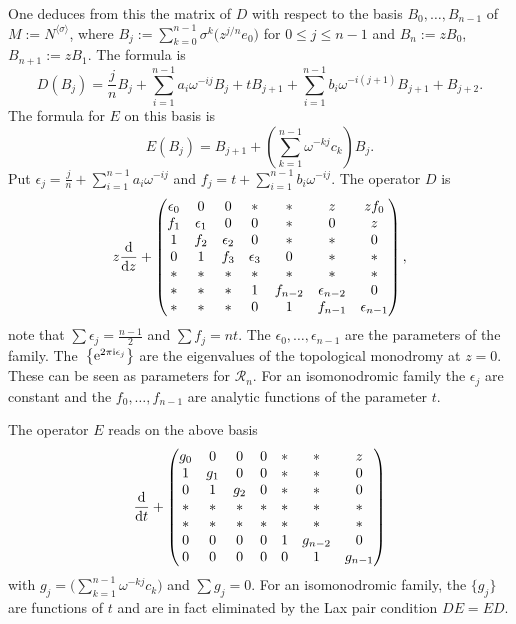 \documentclass[pdftex]{sigma}
\numberwithin{equation}{section}
\begin{document}
 One deduces from this the matrix of $D$ with respect to the basis $B_0,\dots ,B_{n-1}$ of $M:=N^{\langle\sigma\rangle}$,
 where $B_j:=\sum_{k=0}^{n-1} \sigma^k\bigl(z^{j/n}e_0\bigr)$ for $0\leq j\leq n-1$ and $B_n:=zB_0$, $
 B_{n+1}:=zB_1$. The formula is
 \[D(B_j)=\frac{j}{n}B_j+\sum _{i=1}^{n-1}a_i\omega^{-ij}B_j+tB_{j+1}+\sum_{i=1}^{n-1}b_i\omega^{-i(j+1)}B_{j+1}+B_{j+2}.\]
 The formula for $E$ on this basis is
 \[
 E(B_j)= B_{j+1}+\left(\sum _{k=1}^{n-1}\omega^{-kj}c_k\right)B_j.
 \]
 Put $\epsilon_j=\frac{j}{n}+\sum _{i=1}^{n-1}a_i\omega^{-ij}$ and $f_j=t+\sum_{i=1}^{n-1} b_i\omega^{-ij}$. The operator $D$ is
\[
 z\frac{{\rm d}}{{\rm d}z} + \left(\begin{matrix}
 \epsilon_0 &0 &0 &* &* &z & zf_0\\
 f_1 & \epsilon_1& 0 &0 &* & 0 & z \\
 1 & f_2 & \epsilon_2 & 0 & * & * & 0 \\
 0 & 1 & f_3 &\epsilon_3 & 0 & * & * \\
 * & * & * & * & * & * & * \\
 * & * & * & 1 & f_{n-2} &\epsilon_{n-2} & 0 \\
 * & * & * & 0 & 1 & f_{n-1} & \epsilon_{n-1}
 \end{matrix}\right),
 \]
 note that $\sum \epsilon _j=\frac{n-1}{2}$ and $\sum f_j=nt$.
The $\epsilon_0,\dots ,\epsilon_{n-1}$ are the parameters of the family.
 The~$\bigl\{{\rm e}^{2\pi {\rm i} \epsilon_j}\bigr\}$ are the eigenvalues of the topological monodromy at $z=0$. These can be seen as parameters for $\mathcal{R}_n$. For an isomonodromic family the $\epsilon_j$ are constant and the
$f_0,\dots ,f_{n-1}$ are analytic functions of the parameter $t$.

 The operator $E$ reads on the above basis
\[\frac{{\rm d}}{{\rm d}t}+ \left(\begin{matrix}
 g_0 &0 &0 &0 &* &* & z\\
 1 & g_1& 0 &0 &* & * & 0 \\
 0 & 1 & g_2 & 0 & * & * & 0 \\
 * & * & * & * & * & * & * \\
 * & * & * & * &* & * & * \\
 0 & 0 & 0 & 0 & 1 &g_{n-2} & 0 \\
 0 & 0 & 0 & 0 & 0 & 1 & g_{n-1}
 \end{matrix}\right)
 \]
with $g_j=\bigl(\sum _{k=1}^{n-1}\omega^{-kj}c_k\bigr)$ and $\sum g_j=0$.
For an isomonodromic family, the $\{g_j\}$ are functions of $t$ and are in fact eliminated by the Lax pair
condition $DE=ED$.
\end{document}

